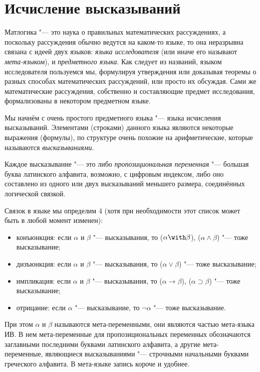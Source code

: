 \section{Исчисление высказываний}

Матлогика "--- это наука о правильных математических рассуждениях, а поскольку
рассуждения обычно ведутся на каком-то языке, то она неразрывна связана с идеей
двух языков: \emph{языка исследователя} (или иначе его называют \emph{мета-языком}),
и \emph{предметного языка}. Как следует из названий, языком исследователя 
пользуемся мы, формулируя утверждения или доказывая теоремы о разных способах
математических рассуждений, или просто их обсуждая. Сами же математические рассуждения,
собственно и составляющие предмет исследования, формализованы в некотором предметном 
языке.

Мы начнём с очень простого предметного языка "--- языка исчисления высказываний.
Элементами (строками) данного языка являются некоторые выражения (формулы), по структуре
очень похожие на арифметические, которые называются \emph{высказываниями}.

Каждое высказывание "--- это либо \emph{пропозициональная переменная} "--- 
большая буква латинского алфавита, возможно, с цифровым индексом, либо 
оно составлено из одного или двух высказываний меньшего размера, соединённых логической связкой.

Связок в языке мы определим 4 (хотя при необходимости этот список может быть
в любой момент изменен):
\begin{itemize}
\item конъюнкция: если $\alpha$ и $\beta$ "--- высказывания, то ($\alpha \with
  \beta$), ($\alpha \land \beta$) "--- тоже высказывание;
\item дизъюнкция: если $\alpha$ и $\beta$ "--- высказывания, то ($\alpha \vee
  \beta$) "--- тоже высказывание;
\item импликация: если $\alpha$ и $\beta$ "--- высказывания, то ($\alpha
  \rightarrow \beta$), ($\alpha \supset \beta$) "--- тоже высказывание;
\item отрицание: если $\alpha$ "--- высказывание, то $\neg\alpha$ "--- тоже высказывание.
\end{itemize}

При этом $\alpha$ и $\beta$ называются мета-переменными, они являются частью
мета-языка ИВ. В нем мета-переменные для пропозициональных переменных
обозначаются заглавными последними буквами латинского алфавита, а другие
мета-переменные, являющиеся высказываниями "--- строчными начальными буквами греческого алфавита. В мета-языке
запись короче и удобнее.

